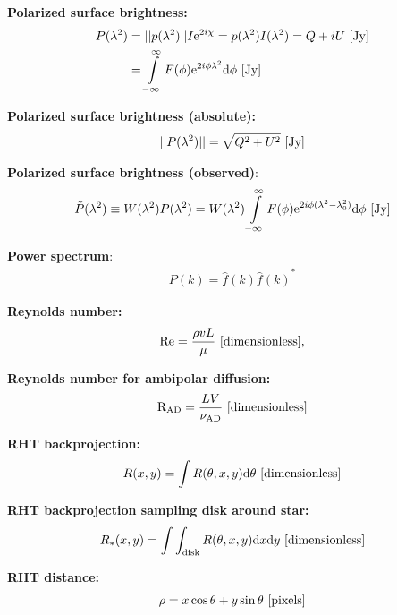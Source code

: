 \documentclass[a4paper,10pt]{article}
\begin{document}
{\noindent}\textbf{Polarized surface brightness:}
\begin{align*}
P(\lambda^2) &= \lvert\lvert p(\lambda^2) \rvert\rvert I\mathrm{e}^{2i\chi} = p(\lambda^2)I(\lambda^2) = Q+iU ~ [\rm Jy] \\
&= \int\limits_{-\infty}^\infty F(\phi)\mathrm{e}^{2i\phi\lambda^2}\mathrm{d}\phi ~ [\rm Jy]
\end{align*}

{\noindent}\textbf{Polarized surface brightness (absolute):}
\begin{align*}
\lvert\lvert P(\lambda^2) \rvert\rvert = \sqrt{Q^2+U^2} ~ [\rm Jy]
\end{align*}

{\noindent}\textbf{Polarized surface brightness (observed)}:
\begin{align*}
\tilde{P}(\lambda^2) \equiv W(\lambda^2)P(\lambda^2) = W(\lambda^2) \int\limits_{-\infty}^\infty F(\phi)\mathrm{e}^{2i\phi(\lambda^2-\lambda_0^2)}\mathrm{d}\phi ~ [\rm Jy]
\end{align*}

{\noindent}\textbf{Power spectrum}:
\begin{align*}
    P(k) = \hat{f}(k){\hat{f}(k)}^*
\end{align*}

{\noindent}\textbf{Reynolds number:}
\begin{align*}
    {\rm Re} = \frac{\rho vL}{\mu} ~ [{\rm dimensionless}],
\end{align*}

{\noindent}\textbf{Reynolds number for ambipolar diffusion:}
\begin{align*}
    {\rm R}_\mathrm{\rm AD} = \dfrac{LV}{\nu_\mathrm{AD}} ~ [{\rm dimensionless}]
\end{align*}

{\noindent}\textbf{RHT backprojection:}
\begin{align*}
    R(x,y) = \int R(\theta,x,y)\mathrm{d}\theta ~ [{\rm dimensionless}]
\end{align*}

{\noindent}\textbf{RHT backprojection sampling disk around star:}
\begin{align*}
    R_*(x,y) = \int\int_\mathrm{disk} R(\theta,x,y)\mathrm{d}x\mathrm{d}y ~ [{\rm dimensionless}]
\end{align*}

{\noindent}\textbf{RHT distance:}
\begin{align*}
    \rho = x\cos\theta+y\sin\theta ~ [{\rm pixels}]
\end{align*}
\end{document}
